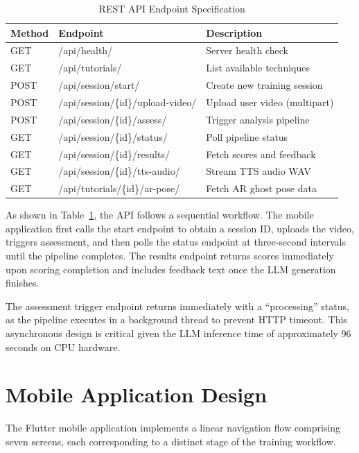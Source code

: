 \begin{sloppypar}
\begin{table}[H]
\centering
\caption{REST API Endpoint Specification}
\label{tab:api_endpoints}
\begin{tabular}{|l|l|p{5.5cm}|}
\hline
\textbf{Method} & \textbf{Endpoint} & \textbf{Description} \\
\hline
GET & /api/health/ & Server health check \\
\hline
GET & /api/tutorials/ & List available techniques \\
\hline
POST & /api/session/start/ & Create new training session \\
\hline
POST & /api/session/\{id\}/upload-video/ & Upload user video (multipart) \\
\hline
POST & /api/session/\{id\}/assess/ & Trigger analysis pipeline \\
\hline
GET & /api/session/\{id\}/status/ & Poll pipeline status \\
\hline
GET & /api/session/\{id\}/results/ & Fetch scores and feedback \\
\hline
GET & /api/session/\{id\}/tts-audio/ & Stream TTS audio WAV \\
\hline
GET & /api/tutorials/\{id\}/ar-pose/ & Fetch AR ghost pose data \\
\hline
\end{tabular}
\end{table}

As shown in Table~\ref{tab:api_endpoints}, the API follows a sequential workflow. The mobile application first calls the start endpoint to obtain a session ID, uploads the video, triggers assessment, and then polls the status endpoint at three-second intervals until the pipeline completes. The results endpoint returns scores immediately upon scoring completion and includes feedback text once the LLM generation finishes.

The assessment trigger endpoint returns immediately with a ``processing'' status, as the pipeline executes in a background thread to prevent HTTP timeout. This asynchronous design is critical given the LLM inference time of approximately 96 seconds on CPU hardware.


\section{Mobile Application Design}

The Flutter mobile application implements a linear navigation flow comprising seven screens, each corresponding to a distinct stage of the training workflow.


\end{sloppypar}

